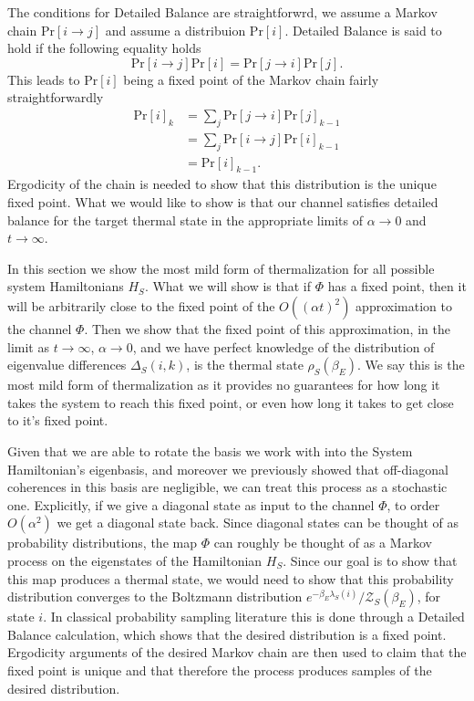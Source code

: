 \documentclass{article}
\newcommand{\prob}[1]{\text{Pr}\left[ #1 \right]}
\newcommand{\bigo}[1]{O\left( #1 \right)}
\newcommand{\partfun}{\mathcal{Z}}
\begin{document}
The conditions for Detailed Balance are straightforwrd, we assume a Markov chain $\prob{i \to j }$ and assume a distribuion $\prob{i}$. Detailed Balance is said to hold if the following equality holds
\begin{equation}
    \prob{i \to j} \prob{i} = \prob{j \to i} \prob{j}.
\end{equation}
This leads to $\prob{i}$ being a fixed point of the Markov chain fairly straightforwardly
\begin{align}
    \prob{i}_k &= \sum_{j} \prob{j \to i} \prob{j}_{k - 1} \\
    &= \sum_j \prob{i \to j} \prob{i}_{k - 1} \\
    &= \prob{i}_{k - 1}.
\end{align}
Ergodicity of the chain is needed to show that this distribution is the unique fixed point. What we would like to show is that our channel satisfies detailed balance for the target thermal state in the appropriate limits of $\alpha \to 0$ and $t \to \infty$. 


In this section we show the most mild form of thermalization for all possible system Hamiltonians $H_S$. What we will show is that if $\Phi$ has a fixed point, then it will be arbitrarily close to the fixed point of the $\bigo{(\alpha t)^2}$ approximation to the channel $\Phi$. Then we show that the fixed point of this approximation, in the limit as $t \to \infty$, $\alpha \to 0$, and we have perfect knowledge of the distribution of eigenvalue differences $\Delta_S(i,k)$, is the thermal state $\rho_S(\beta_E)$. We say this is the most mild form of thermalization as it provides no guarantees for how long it takes the system to reach this fixed point, or even how long it takes to get close to it's fixed point. 

Given that we are able to rotate the basis we work with into the System Hamiltonian's eigenbasis, and moreover we previously showed that off-diagonal coherences in this basis are negligible, we can treat this process as a stochastic one. Explicitly, if we give a diagonal state as input to the channel $\Phi$, to order $\bigo{\alpha^2}$ we get a diagonal state back. Since diagonal states can be thought of as probability distributions, the map $\Phi$ can roughly be thought of as a Markov process on the eigenstates of the Hamiltonian $H_S$. Since our goal is to show that this map produces a thermal state,
we would need to show that this probability distribution converges to the Boltzmann distribution $e^{-\beta_E \lambda_S(i)} / \partfun_S(\beta_E)$, for state $i$. In classical probability sampling literature this is done through a Detailed Balance calculation, which shows that the desired distribution is a fixed point. Ergodicity arguments of the desired Markov chain are then used to claim that the fixed point is unique and that therefore the process produces samples of the desired distribution.
\end{document}
